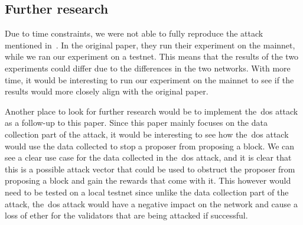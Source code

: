 \subsection{Further research}\label{subsec:further-research}
Due to time constraints, we were not able to fully reproduce the attack mentioned in~\cite{heimbach2024deanonymizingethereumvalidatorsp2p}.
In the original paper, they run their experiment on the mainnet, while we ran our experiment on a testnet.
This means that the results of the two experiments could differ due to the differences in the two networks.
With more time, it would be interesting to run our experiment on the mainnet to see if the results would more closely align with the original paper.


Another place to look for further research would be to implement the~\gls{dos} attack as a follow-up to this paper.
Since this paper mainly focuses on the data collection part of the attack, it would be interesting to see how the~\gls{dos} attack would use the data collected to stop a proposer from proposing a block.
We can see a clear use case for the data collected in the~\gls{dos} attack, and it is clear that this is a possible attack vector that could be used to obstruct the proposer from proposing a block and gain the rewards that come with it.
This however would need to be tested on a local testnet since unlike the data collection part of the attack, the~\gls{dos} attack would have a negative impact on the network and cause a loss of ether for the validators that are being attacked if successful.